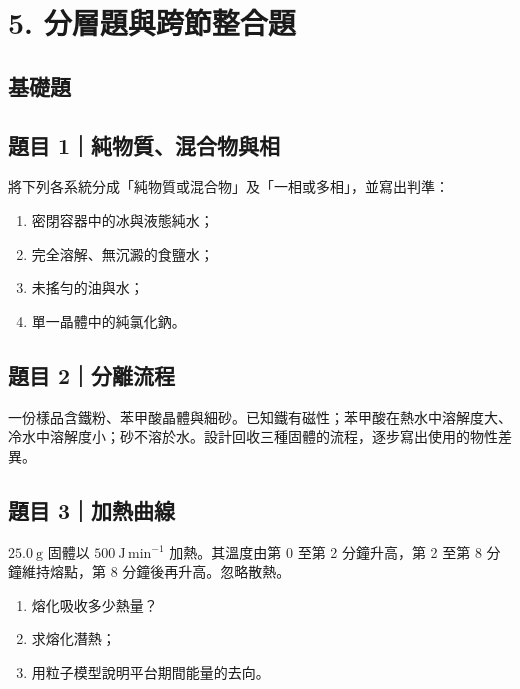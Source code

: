 \documentclass[11pt,a4paper]{article}
\providecommand{\tightlist}{%
  \setlength{\itemsep}{0pt}\setlength{\parskip}{0pt}}
\begin{document}
\section{5. 分層題與跨節整合題}\label{ux5206ux5c64ux984cux8207ux8de8ux7bc0ux6574ux5408ux984c}

\subsection{基礎題}\label{ux57faux790eux984c}

\subsection{題目 1｜純物質、混合物與相}\label{ux984cux76ee-1ux7d14ux7269ux8ceaux6df7ux5408ux7269ux8207ux76f8}

將下列各系統分成「純物質或混合物」及「一相或多相」，並寫出判準：

\begin{enumerate}
\def\labelenumi{\arabic{enumi}.}
\tightlist
\item
  密閉容器中的冰與液態純水；
\item
  完全溶解、無沉澱的食鹽水；
\item
  未搖勻的油與水；
\item
  單一晶體中的純氯化鈉。
\end{enumerate}

\subsection{題目 2｜分離流程}\label{ux984cux76ee-2ux5206ux96e2ux6d41ux7a0b}

一份樣品含鐵粉、苯甲酸晶體與細砂。已知鐵有磁性；苯甲酸在熱水中溶解度大、冷水中溶解度小；砂不溶於水。設計回收三種固體的流程，逐步寫出使用的物性差異。

\subsection{題目 3｜加熱曲線}\label{ux984cux76ee-3ux52a0ux71b1ux66f2ux7dda}

\(25.0\ \mathrm g\) 固體以 \(500\ \mathrm{J\,min^{-1}}\) 加熱。其溫度由第 0 至第 2 分鐘升高，第 2 至第 8 分鐘維持熔點，第 8 分鐘後再升高。忽略散熱。

\begin{enumerate}
\def\labelenumi{\arabic{enumi}.}
\tightlist
\item
  熔化吸收多少熱量？
\item
  求熔化潛熱；
\item
  用粒子模型說明平台期間能量的去向。
\end{enumerate}
\end{document}
